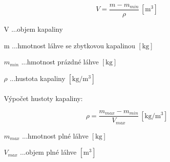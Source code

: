 \begin{equation}
    V = \frac{m - m_{min}}{\rho} \, \left[\mathrm{m^3}\right] \label{objem_kapalina}
\end{equation}

V ...objem kapaliny

m ...hmotnost láhve se zbytkovou kapalinou \([\mathrm{kg}]\)

\(m_{min}\) ...hmotnost prázdné láhve \([\mathrm{kg}]\)

\(\rho\) ...hustota kapaliny \([\mathrm{kg/m^3}]\)
\\
\\
Výpočet hustoty kapaliny:

\begin{equation}
    \rho = \frac{m_{max} - m_{min}}{V_{max}} \, \left[\mathrm{kg/m^3}\right] 
    \label{hustota_kapalina}
\end{equation}


\(m_{max}\) ...hmotnost plné láhve \([\mathrm{kg}]\)

\(V_{max}\) ...objem plné láhve \([\mathrm{m^3}]\)
\bigskip

%    
%    

